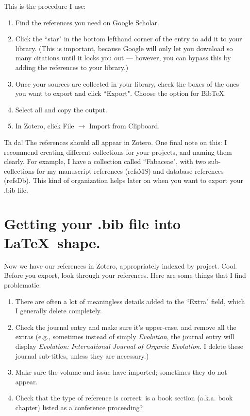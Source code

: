 \documentclass[11pt]{article}
\begin{document}
This is the procedure I use:
\begin{enumerate}
\item{Find the references you need on Google Scholar.}
\item{Click the ``star" in the bottom lefthand corner of the entry to add it to your library. (This is important, because Google will only let you download so many citations until it locks you out --- however, you can bypass this by adding the references to your library.)}
\item{Once your sources are collected in your library, check the boxes of the ones you want to export and click ``Export". Choose the option for Bib\TeX.}
\item{Select all and copy the output.}
\item{In Zotero, click File $\rightarrow$ Import from Clipboard.}
\end{enumerate}

Ta da! The references should all appear in Zotero. One final note on this: I recommend creating different collections for your projects, and naming them clearly. For example, I have a collection called ``Fabaceae", with two sub-collections for my manuscript references (refsMS) and database references (refsDb). This kind of organization helps later on when you want to export your .bib file.\\

\section{Getting your .bib file into \LaTeX\ shape.}

Now we have our references in Zotero, appropriately indexed by project. Cool. Before you export, look through your references. Here are some things that I find problematic:

\begin{enumerate}
\item{There are often a lot of meaningless details added to the ``Extra" field, which I generally delete completely.}
\item{Check the journal entry and make sure it's upper-case, and remove all the extras (e.g., sometimes instead of simply \textit{Evolution}, the journal entry will display \textit{Evolution: International Journal of Organic Evolution}. I delete these journal sub-titles, unless they are necessary.)}
\item{Make sure the volume and issue have imported; sometimes they do not appear.}
\item{Check that the type of reference is correct: is a book section (a.k.a. book chapter) listed as a conference proceeding?}
\end{enumerate}
\end{document}
